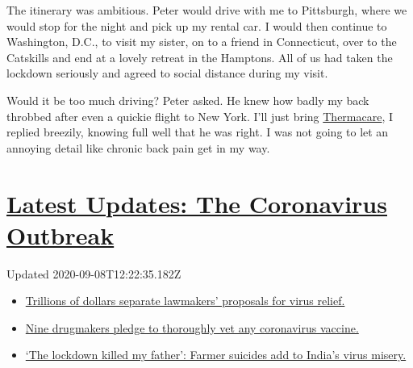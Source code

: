 The itinerary was ambitious. Peter would drive with me to Pittsburgh,
where we would stop for the night and pick up my rental car. I would
then continue to Washington, D.C., to visit my sister, on to a friend in
Connecticut, over to the Catskills and end at a lovely retreat in the
Hamptons. All of us had taken the lockdown seriously and agreed to
social distance during my visit.

Would it be too much driving? Peter asked. He knew how badly my back
throbbed after even a quickie flight to New York. I'll just bring
\href{https://www.thermacare.com/heat-wraps/back-pain-therapy}{Thermacare},
I replied breezily, knowing full well that he was right. I was not going
to let an annoying detail like chronic back pain get in my way.

\hypertarget{latest-updates-the-coronavirus-outbreak}{%
\section{\texorpdfstring{\href{https://www.nytimes3xbfgragh.onion/2020/09/08/world/covid-19-coronavirus.html?action=click\&pgtype=Article\&state=default\&region=MAIN_CONTENT_1\&context=storylines_live_updates}{Latest
Updates: The Coronavirus
Outbreak}}{Latest Updates: The Coronavirus Outbreak}}\label{latest-updates-the-coronavirus-outbreak}}

Updated 2020-09-08T12:22:35.182Z

\begin{itemize}
\tightlist
\item
  \href{https://www.nytimes3xbfgragh.onion/2020/09/08/world/covid-19-coronavirus.html?action=click\&pgtype=Article\&state=default\&region=MAIN_CONTENT_1\&context=storylines_live_updates\#link-46162376}{Trillions
  of dollars separate lawmakers' proposals for virus relief.}
\item
  \href{https://www.nytimes3xbfgragh.onion/2020/09/08/world/covid-19-coronavirus.html?action=click\&pgtype=Article\&state=default\&region=MAIN_CONTENT_1\&context=storylines_live_updates\#link-679303d7}{Nine
  drugmakers pledge to thoroughly vet any coronavirus vaccine.}
\item
  \href{https://www.nytimes3xbfgragh.onion/2020/09/08/world/covid-19-coronavirus.html?action=click\&pgtype=Article\&state=default\&region=MAIN_CONTENT_1\&context=storylines_live_updates\#link-1c973131}{`The
  lockdown killed my father': Farmer suicides add to India's virus
  misery.}
\end{itemize}

